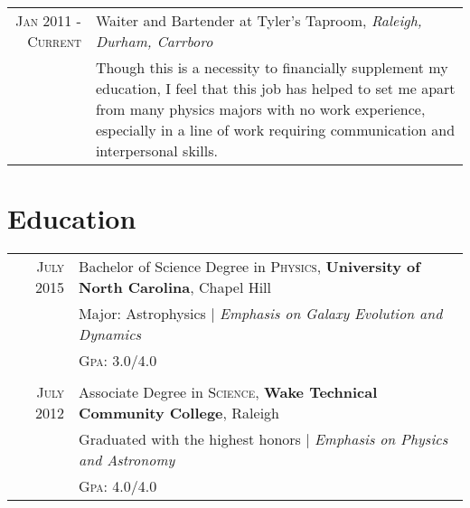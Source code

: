 \documentclass[a4paper,10pt]{article} %
\begin{document}
\begin{tabular}{r|p{11cm}}

\textsc{Jan 2011 - Current} & Waiter and Bartender at Tyler's Taproom, \emph{Raleigh, Durham, Carrboro}\\
& \footnotesize{Though this is a necessity to financially supplement my education, I feel that this job has helped to set me apart from many physics majors with no work experience, especially in a line of work requiring communication and interpersonal skills.}\\
\end{tabular}
\bigskip


\section{Education}

\begin{tabular}{rl}	
\textsc{July} 2015 & Bachelor of Science Degree in \textsc{Physics}, \textbf{University of North Carolina}, Chapel Hill\\
& \small Major: Astrophysics | \emph{Emphasis on Galaxy Evolution and Dynamics}\\
&\normalsize \textsc{Gpa}: 3.0/4.0\\%
&\\


\textsc{July} 2012 & Associate Degree in \textsc{Science}, \textbf{Wake Technical Community College}, Raleigh \\
& \small Graduated with the highest honors  | \emph{Emphasis on Physics and Astronomy} \normalsize \\
&\normalsize \textsc{Gpa}: 4.0/4.0\\%


\end{tabular}
\end{document}
